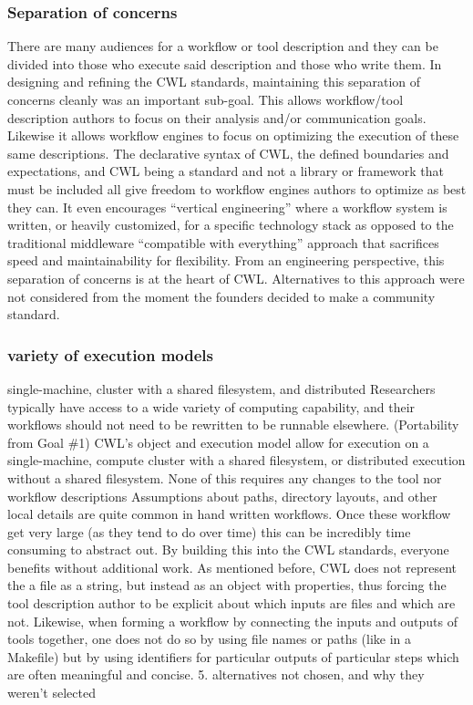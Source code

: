 \subsubsection{Separation of concerns}
There are many audiences for a workflow or tool description and they can be divided into those who execute said description and those who write them.
In designing and refining the CWL standards, maintaining this separation of concerns cleanly was an important sub-goal.
This allows workflow/tool description authors to focus on their analysis and/or communication goals. Likewise it allows workflow engines to focus on optimizing the execution of these same descriptions.
The declarative syntax of CWL, the defined boundaries and expectations, and CWL being a standard and not a library or framework that must be included all give freedom to workflow engines authors to optimize as best they can. It even encourages “vertical engineering” where a workflow system is written, or heavily customized, for a specific technology stack as opposed to the traditional middleware “compatible with everything” approach that sacrifices speed and maintainability for flexibility.
From an engineering perspective, this separation of concerns is at the heart of CWL. Alternatives to this approach were not considered from the moment the founders decided to make a community standard.
\subsubsection{variety of execution models}
single-machine, cluster with a shared filesystem, and distributed
Researchers typically have access to a wide variety of computing capability, and their workflows should not need to be rewritten to be runnable elsewhere. (Portability from Goal \#1)
CWL’s object and execution model allow for execution on a single-machine, compute cluster with a shared filesystem, or distributed execution without a shared filesystem. None of this requires any changes to the tool nor workflow descriptions
Assumptions about paths, directory layouts, and other local details are quite common in hand written workflows. Once these workflow get very large (as they tend to do over time) this can be incredibly time consuming to abstract out. By building this into the CWL standards, everyone benefits without additional work.
As mentioned before, CWL does not represent the a file as a string, but instead as an object with properties, thus forcing the tool description author to be explicit about which inputs are files and which are not. Likewise, when forming a workflow by connecting the inputs and outputs of tools together, one does not do so by using file names or paths (like in a Makefile) but by using identifiers for particular outputs of particular steps which are often meaningful and concise.
5. alternatives not chosen, and why they weren't selected
